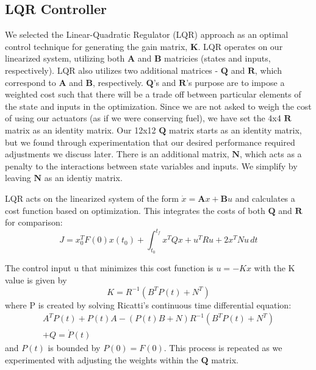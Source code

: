 \documentclass{article}
\begin{document}
\begin{multicols}{2}
\section*{LQR Controller}
We selected the Linear-Quadratic Regulator (LQR) approach as an optimal control technique for generating the gain matrix, $\boldsymbol{K}$.  LQR operates on our linearized system, utilizing both $\boldsymbol{A}$ and $\boldsymbol{B}$ matricies (states and inputs, respectively). LQR also utilizes two additional matrices - $\boldsymbol{Q}$ and $\boldsymbol{R}$, which correspond to $\boldsymbol{A}$ and $\boldsymbol{B}$, respectively. $\boldsymbol{Q}$'s and $\boldsymbol{R}$'s purpose are to impose a weighted cost such that there will be a trade off between particular elements of the state and inputs in the optimization. Since we are not asked to weigh the cost of using our actuators (as if we were conserving fuel), we have set the 4x4 $\boldsymbol{R}$ matrix as an identity matrix. Our 12x12 $\boldsymbol{Q}$ matrix starts as an identity matrix, but we found through experimentation that our desired performance required adjustments we discuss later. There is an additional matrix, $\boldsymbol{N}$, which acts as a penalty to the interactions between state variables and inputs.  We simplify by leaving $\boldsymbol{N}$ as an identiy matrix.

LQR acts on the linearized system of the form $\dot{x} = \boldsymbol{A}x + \boldsymbol{B}u$ and calculates a cost function based on optimization.  This 
integrates the costs of both $\boldsymbol{Q}$ and $\boldsymbol{R}$ for comparison:
\begin{equation}
J =x_0^TF(0)x(t_0) +  \int_{t_0}^{t_f} x^TQx+u^TRu +2x^TNu\,dt 
\end{equation}

The control input u that minimizes this cost function is $u= -Kx$ with the K value is given by
\begin{equation}
K = R^{-1}(B^TP(t) + N^T)
\end{equation}
\noindent
where P is created by solving Ricatti's continuous time differential equation:
\begin{align}
A^TP(t) + P(t)A - (P(t)B + N)R^{-1}(B^TP(t) + N^T) \nonumber\\+ Q = \dot{P}(t)
\end{align}
\noindent
and $P(t)$ is bounded by $P(0) = F(0)$. This process is repeated as we experimented with adjusting the weights within the $
\boldsymbol{Q}$ matrix.


\end{multicols}
\end{document}
